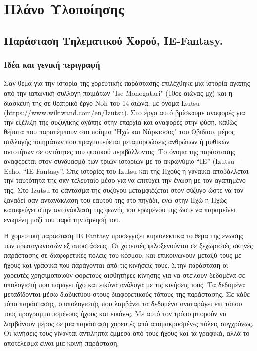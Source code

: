 \section{Πλάνο Υλοποίησης}
\label{sec:org70abd48}
\subsection{Παράσταση Τηλεματικού Χορού, IE-Fantasy.}
\label{sec:org8a4e4e9}
\subsubsection{Ιδέα και γενική περιγραφή}
\label{sec:orgeb5bd27}
Σαν θέμα για την ιστορία της χορευτικής παράστασης επιλέχθηκε μια ιστορία αγάπης από την ιαπωνική συλλογή ποιμάτων "Ise Monogatari" (10ος αιώνας μχ) και η διασκευή της σε θεατρικό έργο Noh του 14 αιώνα, με όνομα Izutsu (\url{https://www.wikiwand.com/en/Izutsu}).  Στο έργο αυτό βρίσκουμε αναφορές για την εξέλιξη της συζυγικής αγάπης στην επαρχία και αναφορές στην φύση, καθώς θέματα που παραπέμπουν στο ποίημα "Ηχώ και Νάρκισσος" του Οβιδίου, μέρος συλλογής ποιημάτων που πραγματεύεται μεταμορφώσεις ανθρώπων ή μυθικών οντοτήτων σε οντότητες του φυσικού περιβάλλοντος. Το όνομα της παράστασης αναφέρεται στον συνδυασμό των τριών ιστοριών με το ακρωνύμιο “IE” (Izutsu – Echo, “IE Fantasy”. Στις ιστορίες του Izutsu και της Ηχούς η γυναίκα αποβάλλεται την ταυτότητά της σαν τελευταίο μέσο για να επιτύχει την ένωση με τον αγαπημένο της. Στο Izutsu το φάντασμα της συζύγου μεταμφιέζεται στον σύζυγο ώστε να τον ξαναδεί σαν αντανάκλαση του εαυτού της στο πηγάδι, ενώ στην Ηχώ η Ηχώς καταφεύγει στην αντανάκλαση της φωνής του ερωμένου της ώστε να παραμείνει ενωμένη μαζί του παρά την άρνησή του.

Η χορευτική παράσταση IE Fantasy προσεγγίζει κυριολεκτικά το θέμα της ένωσης των πρωταγωνιστών εξ αποστάσεως. Οι χορευτές φιλοξενούνται σε ξεχωριστές σκηνές παράστασης σε διαφορετικές πόλεις του κόσμου, και επικοινωνουν μεταξύ τους με ήχους και γραφικά που παράγονται από τις κινήσεις τους.  Στην παράσταση οι χορευτές χρησιμοποιούν φορετούς αισθητήρες κίνησης για να στείλουν δεδομένα σε υπολογιστή που παράγει ήχο και εικόνα ανάλογα με τις κινήσεις τους.  Τα δεδομένα μεταδίδονται μέσω διαδικτύου στους διαφορετικούς τόπους της παράστασης.  Σε κάθε τόπο παράστασης, ο υπολογιστής που λαμβάνει τα δεδομένα αναπαράγει επι τόπου τους προγραμματισμένους ήχους και εικόνες.  Με αυτό τον τρόπο μπορούν να λαμβάνουν μέρος σε μια παράσταση χορευτές από απομακρυσμένες πόλεις συγχρόνως.  Οι κινήσεις τους γίνονται αντιληπτά έμμεσα από τους ήχους και τα γραφικά, αλλά το αποτέλεσμα είναι μια κοινή παράσταση.

